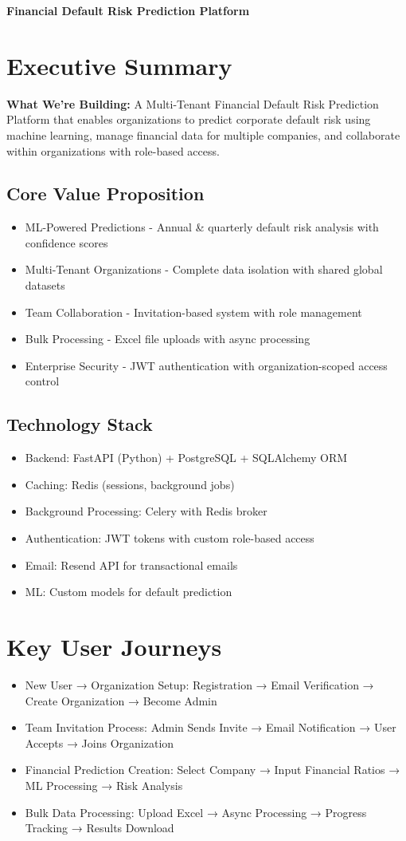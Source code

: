 \documentclass[a4paper,12pt]{article}
\newcommand{\subitem}[1]{\item[\textbullet] #1}
\begin{document}
\begin{center}
    \textbf{\Large Financial Default Risk Prediction Platform}
\end{center}

\section*{Executive Summary}

\textbf{What We're Building:} A Multi-Tenant Financial Default Risk Prediction Platform that enables organizations to predict corporate default risk using machine learning, manage financial data for multiple companies, and collaborate within organizations with role-based access.

\subsection*{Core Value Proposition}
\begin{itemize}
    \subitem ML-Powered Predictions - Annual \& quarterly default risk analysis with confidence scores
    \subitem Multi-Tenant Organizations - Complete data isolation with shared global datasets
    \subitem Team Collaboration - Invitation-based system with role management
    \subitem Bulk Processing - Excel file uploads with async processing
    \subitem Enterprise Security - JWT authentication with organization-scoped access control
\end{itemize}

\subsection*{Technology Stack}
\begin{itemize}
    \subitem Backend: FastAPI (Python) + PostgreSQL + SQLAlchemy ORM
    \subitem Caching: Redis (sessions, background jobs)
    \subitem Background Processing: Celery with Redis broker
    \subitem Authentication: JWT tokens with custom role-based access
    \subitem Email: Resend API for transactional emails
    \subitem ML: Custom models for default prediction
\end{itemize}

\section*{Key User Journeys}
\begin{itemize}
    \subitem New User → Organization Setup: Registration → Email Verification → Create Organization → Become Admin
    \subitem Team Invitation Process: Admin Sends Invite → Email Notification → User Accepts → Joins Organization
    \subitem Financial Prediction Creation: Select Company → Input Financial Ratios → ML Processing → Risk Analysis
    \subitem Bulk Data Processing: Upload Excel → Async Processing → Progress Tracking → Results Download
\end{itemize}
\end{document}
